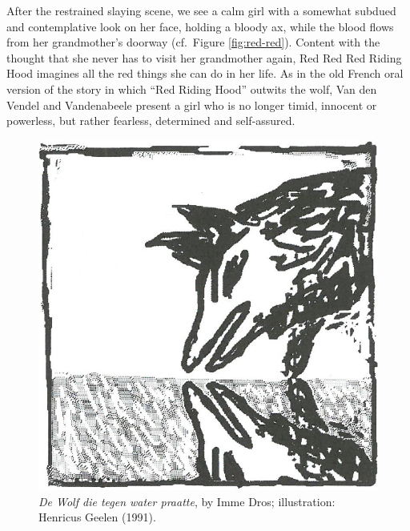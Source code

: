 After the restrained slaying scene, we see a calm girl with a somewhat subdued and contemplative look on her face, holding a bloody ax, while the blood flows from her grandmother's doorway (cf.\ Figure \ref{fig:red-red}). Content with the thought that she never has to visit her grandmother again, Red Red Red Riding Hood imagines all the red things she can do in her life. As in the old French oral version of the story in which ``Red Riding Hood'' outwits the wolf, Van den Vendel and Vandenabeele present a girl who is no longer timid, innocent or powerless, but rather fearless, determined and self-assured.

\begin{figure}[t]
    \centering
    \includegraphics[width=\textwidth]{images/Waterwolf}
    \caption{\emph{De Wolf die tegen water praatte}, by Imme Dros; illustration: Henricus Geelen (1991).}
    \label{fig:waterwolf}
\end{figure}

